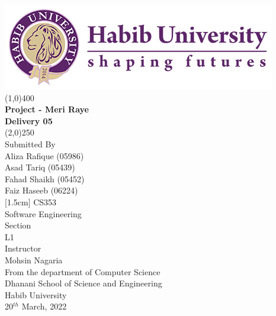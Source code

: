 \begin{titlepage}
\thispagestyle{empty}
\begin{center}
\includegraphics[scale=0.40]{Figures/HU-LOGO--01.jpg}
\line(1,0){400}\\
[2mm]
\selectfont
\textbf{Project - Meri Raye \\ Delivery 05}\\
\line(2,0){250}\\
[0.5cm]
Submitted By\\
Aliza Rafique (05986)\\
Asad Tariq (05439)\\
Fahad Shaikh (05452)\\
Faiz Haseeb (06224)\\
[1.5cm]
CS353\\
Software Engineering\\ 
[1.0cm]
Section\\
L1\\
[1.0cm]
Instructor\\
Mohsin Nagaria\\
[1.5cm]
From the department of Computer Science\\
Dhanani School of Science and Engineering\\
Habib University\\
20$^{th}$ March, 2022
\end{center} 
\end{titlepage}